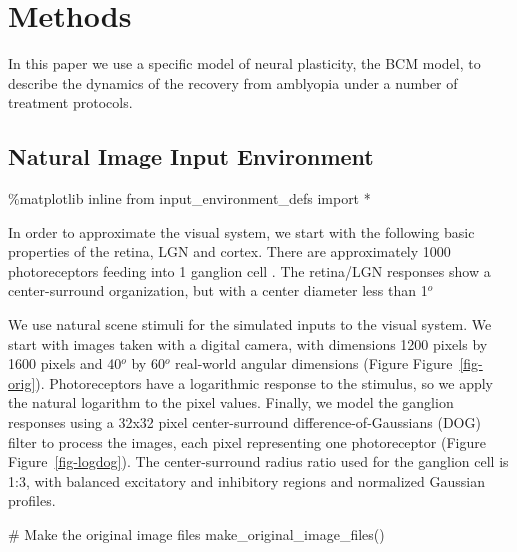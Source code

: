 \documentclass[
  letterpaper,
  number]{elsarticle}
\newenvironment{Shaded}{\begin{snugshade}}{\end{snugshade}}
\newcommand{\CommentTok}[1]{\textcolor[rgb]{0.37,0.37,0.37}{#1}}
\newcommand{\ImportTok}[1]{\textcolor[rgb]{0.00,0.46,0.62}{#1}}
\newcommand{\NormalTok}[1]{\textcolor[rgb]{0.00,0.23,0.31}{#1}}
\newcommand{\OperatorTok}[1]{\textcolor[rgb]{0.37,0.37,0.37}{#1}}
\begin{document}
\part{Methods}

In this paper we use a specific model of neural plasticity, the BCM
model\citep{BCM82}, to describe the dynamics of the recovery from
amblyopia under a number of treatment protocols.

\hypertarget{natural-image-input-environment}{%
\chapter{Natural Image Input
Environment}\label{natural-image-input-environment}}

\begin{Shaded}
\begin{Highlighting}[]
\OperatorTok{\%}\NormalTok{matplotlib inline}
\ImportTok{from}\NormalTok{ input\_environment\_defs }\ImportTok{import} \OperatorTok{*}
\end{Highlighting}
\end{Shaded}

In order to approximate the visual system, we start with the following
basic properties of the retina, LGN and cortex. There are approximately
1000 photoreceptors feeding into 1 ganglion cell
\citep{JeonEtAl1998, SterlingEtAl1988}. The retina/LGN responses show a
center-surround organization, but with a center diameter less than
1\(^o\) \citep{hubel1995eye}

We use natural scene stimuli for the simulated inputs to the visual
system. We start with images taken with a digital camera, with
dimensions 1200 pixels by 1600 pixels and 40\(^o\) by 60\(^o\)
real-world angular dimensions (Figure Figure~\ref{fig-orig}).
Photoreceptors have a logarithmic response to the stimulus, so we apply
the natural logarithm to the pixel values. Finally, we model the
ganglion responses using a 32x32 pixel center-surround
difference-of-Gaussians (DOG) filter to process the images, each pixel
representing one photoreceptor (Figure Figure~\ref{fig-logdog}). The
center-surround radius ratio used for the ganglion cell is 1:3, with
balanced excitatory and inhibitory regions and normalized Gaussian
profiles.

\begin{Shaded}
\begin{Highlighting}[]
\CommentTok{\# Make the original image files}
\NormalTok{make\_original\_image\_files()}

\end{Highlighting}
\end{Shaded}
\end{document}
